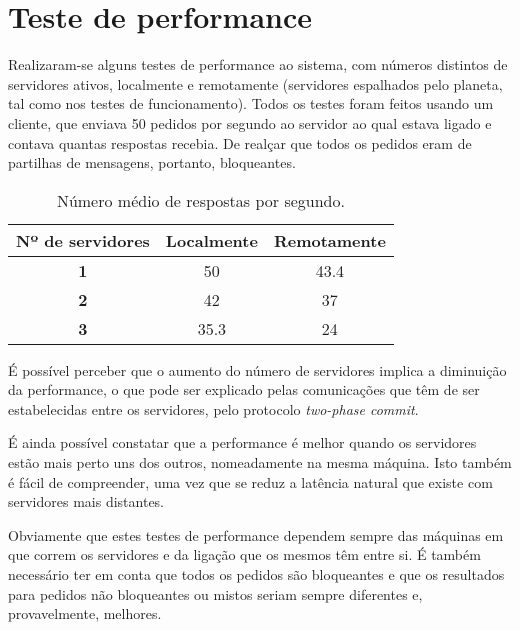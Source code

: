 \documentclass[a4paper]{report}
\begin{document}
	\section{Teste de performance}
		Realizaram-se alguns testes de performance ao sistema, com números distintos de servidores ativos, localmente e remotamente (servidores espalhados pelo planeta, tal como nos testes de funcionamento).
		Todos os testes foram feitos usando um cliente, que enviava 50 pedidos por segundo ao servidor ao qual estava ligado e contava quantas respostas recebia.
		De realçar que todos os pedidos eram de partilhas de mensagens, portanto, bloqueantes.
		
		\begin{table}[h!]
			\begin{center}
				\caption{Número médio de respostas por segundo.}
				\label{tab:table1}
					\begin{tabular}{c|c|c}
						\textbf{Nº de servidores} & \textbf{Localmente} & \textbf{Remotamente}\\
						\hline
						\textbf{1} & 50 & 43.4\\
						\textbf{2} & 42 & 37\\
						\textbf{3} & 35.3 & 24\\
					\end{tabular}
			\end{center}
		\end{table}

		É possível perceber que o aumento do número de servidores implica a diminuição da performance, o que pode ser explicado pelas comunicações que têm de ser estabelecidas entre os servidores, pelo protocolo \textit{two-phase commit}.
		
		É ainda possível constatar que a performance é melhor quando os servidores estão mais perto uns dos outros, nomeadamente na mesma máquina. Isto também é fácil de compreender, uma vez que se reduz a latência natural que existe com servidores mais distantes.

		Obviamente que estes testes de performance dependem sempre das máquinas em que correm os servidores e da ligação que os mesmos têm entre si.
		É também necessário ter em conta que todos os pedidos são bloqueantes e que os resultados para pedidos não bloqueantes ou mistos seriam sempre diferentes e, provavelmente, melhores.
\end{document}
